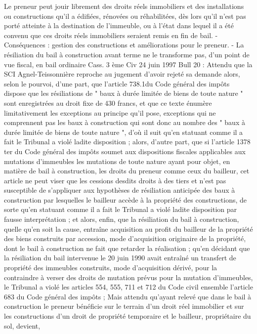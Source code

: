 \documentclass[11pt,a4paper]{report}
\begin{document}
	Le preneur peut jouir librement des droits réels immobiliers et des installations ou constructions qu'il a édifiées,
	rénovées ou réhabilitées, dès lors qu'il n'est pas porté atteinte à la destination de l'immeuble, ou à l'état dans
	lequel il a été convenu que ces droits réels immobiliers seraient remis en fin de bail.
	-Conséquences : gestion des constructions et améliorations pour le preneur.
	- La résiliation du bail à construction avant terme ne le transforme pas, d’un point de vue fiscal, en bail
	ordinaire Cass. 3 ème Civ 24 juin 1997 Bull 20 : Attendu que la SCI Agnel-Teissonnière reproche au jugement
	d'avoir rejeté sa demande alors, selon le pourvoi, d'une part, que l'article 738.1\degre  du Code général des impôts
	dispose que les résiliations de " baux à durée limitée de biens de toute nature " sont enregistrées au droit fixe de
	430 francs, et que ce texte énumère limitativement les exceptions au principe qu'il pose, exceptions qui ne
	comprennent pas les baux à construction qui sont donc au nombre des " baux à durée limitée de biens de toute
	nature ", d'où il suit qu'en statuant comme il a fait le Tribunal a violé ladite disposition ; alors, d'autre part, que
	si l'article 1378 ter du Code général des impôts soumet aux dispositions fiscales applicables aux mutations
	d'immeubles les mutations de toute nature ayant pour objet, en matière de bail à construction, les droits du
	preneur comme ceux du bailleur, cet article ne peut viser que les cessions desdits droits à des tiers et n'est pas
	susceptible de s'appliquer aux hypothèses de résiliation anticipée des baux à construction par lesquelles le
	bailleur accède à la propriété des constructions, de sorte qu'en statuant comme il a fait le Tribunal a violé ladite
	disposition par fausse interprétation ; et alors, enfin, que la résiliation du bail à construction, quelle qu'en soit
	la cause, entraîne acquisition au profit du bailleur de la propriété des biens construits par accession, mode
	d'acquisition originaire de la propriété, dont le bail à construction ne fait que retarder la réalisation ; qu'en
	décidant que la résiliation du bail intervenue le 20 juin 1990 avait entraîné un transfert de propriété des
	immeubles construits, mode d'acquisition dérivé, pour la contraindre à verser des droits de mutation prévus
	pour la mutation d'immeubles, le Tribunal a violé les articles 554, 555, 711 et 712 du Code civil ensemble
	l'article 683 du Code général des impôts ;
	Mais attendu qu'ayant relevé que dans le bail à construction le preneur bénéficie sur le terrain d'un droit réel
	immobilier et sur les constructions d'un droit de propriété temporaire et le bailleur, propriétaire du sol, devient,
\end{document}
